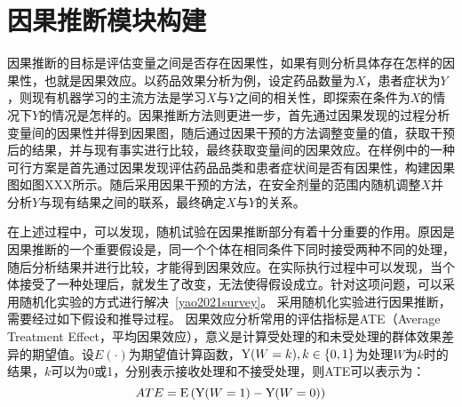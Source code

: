 \documentclass[algorithmlist, AutoFakeBold, AutoFakeSlant, figurelist, tablelist, nomlist, masters]{seuthesix}
\begin{document}
\section{因果推断模块构建}
因果推断的目标是评估变量之间是否存在因果性，如果有则分析具体存在怎样的因果性，也就是因果效应。以药品效果分析为例，设定药品数量为$X$，患者症状为$Y$，则现有机器学习的主流方法是学习$X$与$Y$之间的相关性，即探索在条件为$X$的情况下$Y$的情况是怎样的。因果推断方法则更进一步，首先通过因果发现的过程分析变量间的因果性并得到因果图，随后通过因果干预的方法调整变量的值，获取干预后的结果，并与现有事实进行比较，最终获取变量间的因果效应。在样例中的一种可行方案是首先通过因果发现评估药品品类和患者症状间是否有因果性，构建因果图如图XXX所示。随后采用因果干预的方法，在安全剂量的范围内随机调整$X$并分析$Y$与现有结果之间的联系，最终确定$X$与$Y$的关系。

在上述过程中，可以发现，随机试验在因果推断部分有着十分重要的作用。原因是因果推断的一个重要假设是，同一个个体在相同条件下同时接受两种不同的处理，随后分析结果并进行比较，才能得到因果效应。在实际执行过程中可以发现，当个体接受了一种处理后，就发生了改变，无法使得假设成立。针对这项问题，可以采用随机化实验的方式进行解决~\ref{yao2021survey}。
采用随机化实验进行因果推断，需要经过如下假设和推导过程。
因果效应分析常用的评估指标是ATE（Average Treatment Effect，平均因果效应），意义是计算受处理的和未受处理的群体效果差异的期望值。设$E(\cdot)$为期望值计算函数，${\rm Y}(W=k), k \in \{0, 1\}$为处理$W$为$k$时的结果，$k$可以为0或1，分别表示接收处理和不接受处理，则ATE可以表示为：
\begin{equation}
  ATE={\rm E}\left({\rm Y}(W=1) - {\rm Y}(W=0)\right)
  \label{equation_ATE}
\end{equation}
\end{document}
